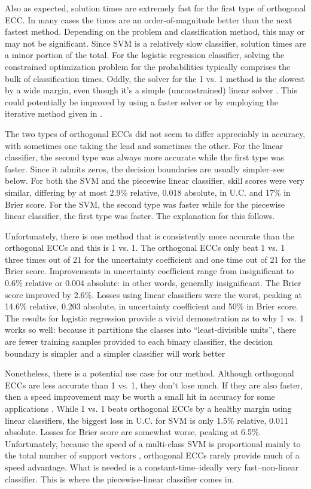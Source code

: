 Also as expected, solution times are
extremely fast for the first type of orthogonal ECC.
In many cases the times are an order-of-magnitude better than the next
fastest method.
Depending on the problem and classification method, this may or may not
be significant.
Since SVM is a relatively slow classifier, solution times
are a minor portion of the total.
For the logistic regression classifier,
solving the constrained optimization problem for the probabilities
typically comprises the bulk of classification times.
Oddly, the solver for the 1 vs. 1 method is the slowest by a wide margin,
even though it's a simple (unconstrained) linear solver \citep{Wu_etal2004}.
This could potentially be improved by using a faster solver or by employing
the iterative method given in \citet{Wu_etal2004}.

The two types of orthogonal ECCs did not seem to differ appreciably in accuracy,
with sometimes one taking the lead and sometimes the other.
For the linear classifier, the second type was always more accurate while the first
type was faster.
Since it admits zeros, the decision boundaries are usually simpler--see below.
For both the SVM and the piecewise linear classifier, skill scores were very similar,
differing by at most 2.9\% relative, 0.018 absolute, in U.C. and 17\% in Brier score.
For the SVM, the second type was faster while for the piecewise linear classifier,
the first type was faster.
The explanation for this follows.

Unfortunately, there is one method that is consistently more accurate than the
orthogonal ECCs and this is 1 vs. 1.
The orthogonal ECCs only beat 1 vs. 1 three times out of 21 for the
uncertainty coefficient and one time out of 21 for the Brier score.
Improvements in uncertainty coefficient range from insignificant
to 0.6\% relative or 0.004 absolute: in other words, generally insignificant.
The Brier score improved by 2.6\%.
Losses using linear classifiers were the worst, peaking at 14.6\% relative,
0.203 absolute, in uncertainty coefficient and 50\% in Brier score.
The results for logistic regression provide a vivid demonstration as to
why 1 vs. 1 works so well: because it partitions the classes into
``least-divisible units'', there are fewer training samples provided to
each binary classifier, the decision boundary is simpler and
a simpler classifier will work better

Nonetheless, there is a potential use case for our method.
Although orthogonal ECCs are less accurate than 1 vs. 1, they
don't lose much.
If they are also faster, then a speed improvement may be worth a small
hit in accuracy for some applications \citep{Mills2018}.
While 1 vs. 1 beats orthogonal ECCs by a healthy margin using linear
classifiers, the biggest loss in U.C. for SVM is only 1.5\% relative, 
0.011 absolute.
Losses for Brier score are somewhat worse,
peaking at 6.5\%.
Unfortunately, because the speed of a multi-class SVM is proportional
mainly to the total number of support vectors \citep{Mills2018},
orthogonal ECCs rarely provide much of a speed advantage.
What is needed is a constant-time--ideally very fast--non-linear classifier.
This is where the piecewise-linear classifier comes in.

